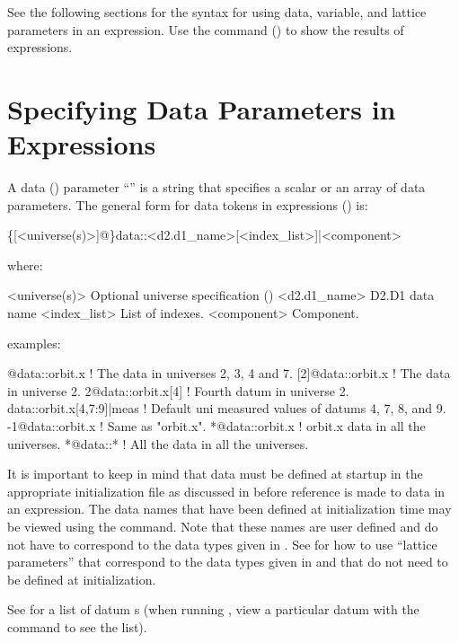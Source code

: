 See the following sections for the syntax for using data, variable, and lattice parameters in an
expression. Use the  command () to show the results of expressions.

\section{Specifying Data Parameters in Expressions}
\label{s:data.token}

A data () parameter ``'' is a string that specifies a scalar or an array
of data parameters.  The general form for data tokens in expressions () is:
\begin{example}
  \{[<universe(s)>]@\}data::<d2.d1_name>[<index_list>]|<component>
\end{example}
where:
\begin{example}
  <universe(s)>       Optional universe specification ()
  <d2.d1_name>        D2.D1 data name
  <index_list>        List of indexes.
  <component>         Component. 
\end{example}
examples:
\begin{example}
  [2:4,7]@data::orbit.x      ! The  data in universes 2, 3, 4 and 7.
  [2]@data::orbit.x          ! The  data in universe 2. 
  2@data::orbit.x[4]         ! Fourth  datum in universe 2.
  data::orbit.x[4,7:9]|meas  ! Default uni measured values of datums 4, 7, 8, and 9.
  -1@data::orbit.x           ! Same as "orbit.x".
  *@data::orbit.x            ! orbit.x data in all the universes.
  *@data::*                  ! All the data in all the universes.
\end{example}

It is important to keep in mind that data must be defined at startup in the appropriate
initialization file as discussed in  before reference is made to data in an
expression. The  data names that have been defined at initialization time may be
viewed using the  command. Note that these names are user defined and do not have to
correspond to the data types given in . See  for how to use
``lattice parameters'' that correspond to the data types given in  and that do
not need to be defined at initialization.

See  for a list of datum s (when running \tao, view a
particular datum with the  command to see the list).

